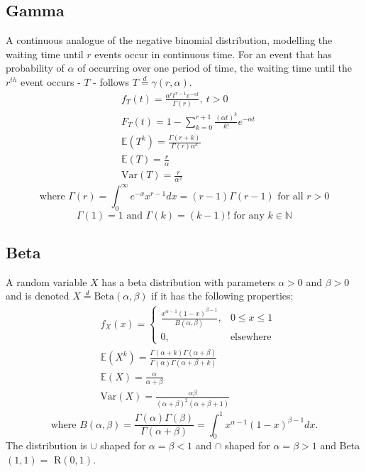 \documentclass[titlepage,twocolumn]{article}
\begin{document}
\subsection*{Gamma}
A continuous analogue of the negative binomial distribution, modelling the waiting time until $r$ events occur in continuous time. For an event that has probability of $\alpha$ of occurring over one period of time, the waiting time until the $r^{th}$ event occurs - $T$ - follows $T\stackrel{d}{=} \gamma(r, \alpha)$.
\begin{align*}
    &f_T(t)=\frac{\alpha^r t^{r-1} e^{-\alpha t}}{\Gamma(r)},\ t > 0\\
    &F_T(t)=1-\sum_{k=0}^{r+1}\frac{(\alpha t)^k}{k!}e^{-\alpha t}\\
    &\mathbb{E}(T^k)=\frac{\Gamma(r+k)}{\Gamma(r)\alpha^k}\\
    &\mathbb{E}(T)=\frac{r}{\alpha}\\
    &\mbox{Var}(T)=\frac{r}{\alpha ^2}
\end{align*}
$$\mbox{where }\Gamma(r) = \int_0^\infty e^{-x}x^{r-1} dx = (r-1)\Gamma(r-1) \mbox{ for all } r > 0$$
$$\Gamma(1) = 1 \mbox{ and } \Gamma(k) = (k-1)! \mbox{ for any } k \in \mathbb{N}$$

\subsection*{Beta}
A random variable $X$ has a beta distribution with parameters $\alpha >0$ and $\beta > 0$ and is denoted $X\stackrel{d}{=}\mbox{Beta}(\alpha, \beta)$ if it has the following properties:
\begin{align*}
    &f_X(x)=\begin{cases} \frac{x^{\alpha-1}(1-x)^{\beta-1}}{B(\alpha,\beta)}, & 0 \leq x \leq 1 \\ 0, & \mbox{elsewhere} \end{cases}\\
    &\mathbb{E}(X^k)=\frac{\Gamma(\alpha+k)\Gamma(\alpha+\beta)}{\Gamma(\alpha)\Gamma(\alpha+\beta+k)}\\
    &\mathbb{E}(X)=\frac{\alpha}{\alpha+\beta}\\
    &\mbox{Var}(X)=\frac{\alpha \beta}{(\alpha+\beta)^2(\alpha+\beta+1)}
\end{align*}
$$\mbox{where }B(\alpha,\beta) = \frac{\Gamma(\alpha)\Gamma(\beta)}{\Gamma(\alpha+\beta)} = \int_0^1x^{\alpha-1}(1-x)^{\beta-1}dx.$$
The distribution is $\cup$ shaped for $\alpha = \beta < 1$ and $\cap$ shaped for $\alpha = \beta > 1$ and Beta$(1,1) =$ R$(0,1)$.
\end{document}

